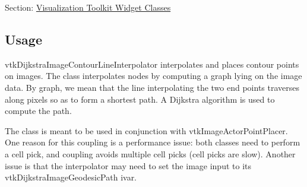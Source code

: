 Section\-: \hyperlink{sec_vtkwidgets}{Visualization Toolkit Widget Classes} \hypertarget{vtkwidgets_vtkxyplotwidget_Usage}{}\subsection{Usage}\label{vtkwidgets_vtkxyplotwidget_Usage}
vtk\-Dijkstra\-Image\-Contour\-Line\-Interpolator interpolates and places contour points on images. The class interpolates nodes by computing a graph lying on the image data. By graph, we mean that the line interpolating the two end points traverses along pixels so as to form a shortest path. A Dijkstra algorithm is used to compute the path.

The class is meant to be used in conjunction with vtk\-Image\-Actor\-Point\-Placer. One reason for this coupling is a performance issue\-: both classes need to perform a cell pick, and coupling avoids multiple cell picks (cell picks are slow). Another issue is that the interpolator may need to set the image input to its vtk\-Dijkstra\-Image\-Geodesic\-Path ivar.

